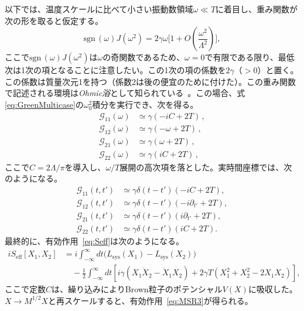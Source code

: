 \medskip
以下では、温度スケールに比べて小さい振動数領域$\omega\ll T$に着目し、重み関数が次の形を取ると仮定する。
\begin{equation}
\label{Ohmic}
 \mathrm{sgn}\, (\omega) J(\omega^2)
  = 2\gamma\omega\Big[ 1 + O \left(\frac{\omega^2}{\Lambda^2}\right) \Big],
\end{equation}
ここで$\mathrm{sgn}\,(\omega)J(\omega^2)$は$\omega$の奇関数であるため、$\omega=0$で有限である限り、最低次は1次の項となることに注意したい。この1次の項の係数を$2\gamma$（$>0$）と置く。この係数は質量次元1を持つ（係数2は後の便宜のために付けた）。この重み関数で記述される環境は\textit{Ohmic浴}として知られている~\cite{kamenev2011field}。この場合、式\eqref{eq:GreenMulticase}の$\omega_0^2$積分を実行でき、次を得る。
\begin{equation}
 \begin{split}
\mathcal{G}_{11} (\omega)
  &\simeq \gamma(-iC
  + 2T)\,,
\\
  \mathcal{G}_{12} (\omega)
  &\simeq \gamma(-\omega
  + 2T)\,,
\\
  \mathcal{G}_{21} (\omega)
  &\simeq  \gamma(\omega
  + 2T)\,,
\\
  \mathcal{G}_{22} (\omega) &\simeq\gamma(iC
  + 2T)\,,
\end{split}
\end{equation}
ここで$C=2\Lambda/\pi$を導入し、$\omega/T$展開の高次項を落とした。実時間座標では、次のようになる。
\begin{equation}
 \begin{split}
\mathcal{G}_{11} (t,t') &\simeq \gamma\delta(t-t')\left(- iC
  + 2T\right),
\\
\mathcal{G}_{12} (t,t')& \simeq \gamma\delta(t-t')\left(- i \partial_{t'}
  + 2T\right),
 \\
 \mathcal{G}_{21} (t,t')
 &\simeq \gamma\delta(t-t')\left( i\partial_{t'}
  + 2T\right),
 \\
 \mathcal{G}_{22} (t,t')
 &\simeq \gamma\delta(t-t')\left( iC
  + 2T\right).
\end{split}
\end{equation}
最終的に、有効作用~\eqref{eq:Seff}は次のようになる。
\begin{align}
\nonumber
 iS_{\mathrm{eff}}[X_1,X_2]
&
 =   i \int_{-\infty}^\infty dt \big(L_{\mathrm{sys}} (X_1) -L_{\mathrm{sys}} (X_2)\big)
 \\
&\quad  -\frac{1}{2}
  \int_{-\infty}^\infty dt
 \left[ i\gamma\left(X_1\dot{X}_2-\dot{X}_1X_2\right) +2\gamma T\left(X_1^2+X_2^2-2X_1X_2\right)\right],
\end{align}
ここで定数$C$は、繰り込みによりBrown粒子のポテンシャル$V(X)$に吸収した。$X\to M^{1/2}X$と再スケールすると、有効作用~\eqref{eq:MSR3}が得られる。


